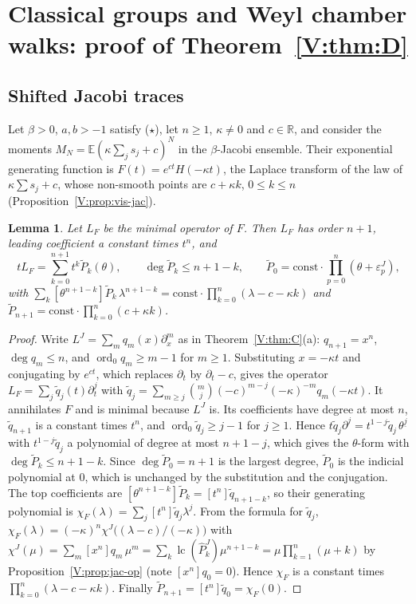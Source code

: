 \documentclass[11pt,a4paper]{article}
\newtheorem{lemma}[theorem]{Lemma}
\theoremstyle{definition}
\theoremstyle{remark}
\newcommand{\R}{\mathbb R}
\newcommand{\E}{\mathbb E}
\newcommand{\ff}[2]{#1^{\underline{#2}}}
\DeclareMathOperator{\ord}{ord}
\DeclareMathOperator{\lc}{lc}
\numberwithin{equation}{section}
\begin{document}
\section{Classical groups and Weyl chamber walks: proof of Theorem~\ref{V:thm:D}}\label{V:sec:walks}

\subsection{Shifted Jacobi traces}
Let $\beta>0$, $a,b>-1$ satisfy \textup{($\star$)}, let $n\ge1$, $\kappa\ne0$ and $c\in\R$, and consider the moments $M_N=\E(\kappa\sum_js_j+c)^N$ in the $\beta$-Jacobi ensemble. Their exponential generating function is $F(t)=e^{ct}H(-\kappa t)$, the Laplace transform of the law of $\kappa\sum s_j+c$, whose non-smooth points are $c+\kappa k$, $0\le k\le n$ (Proposition~\ref{V:prop:vis-jac}).

\begin{lemma}\label{V:lem:shifted}
Let $L_F$ be the minimal operator of $F$. Then $L_F$ has order $n+1$, leading coefficient a constant times $t^n$, and
\[
tL_F=\sum_{k=0}^{n+1}t^k\tilde P_k(\theta),\qquad\deg\tilde P_k\le n+1-k,\qquad\tilde P_0=\mathrm{const}\cdot\prod_{p=0}^n(\theta+\varepsilon^J_p),
\]
with $\sum_k[\theta^{n+1-k}]\tilde P_k\,\lambda^{n+1-k}=\mathrm{const}\cdot\prod_{k=0}^{n}(\lambda-c-\kappa k)$ and $\tilde P_{n+1}=\mathrm{const}\cdot\prod_{k=0}^n(c+\kappa k)$.
\end{lemma}

\begin{proof}
Write $L^J=\sum_mq_m(x)\partial_x^m$ as in Theorem~\ref{V:thm:C}(a): $q_{n+1}=x^n$, $\deg q_m\le n$, and $\ord_0q_m\ge m-1$ for $m\ge1$. Substituting $x=-\kappa t$ and conjugating by $e^{ct}$, which replaces $\partial_t$ by $\partial_t-c$, gives the operator $L_F=\sum_j\tilde q_j(t)\partial_t^j$ with $\tilde q_j=\sum_{m\ge j}\binom mj(-c)^{m-j}(-\kappa)^{-m}q_m(-\kappa t)$. It annihilates $F$ and is minimal because $L^J$ is. Its coefficients have degree at most $n$, $\tilde q_{n+1}$ is a constant times $t^n$, and $\ord_0\tilde q_j\ge j-1$ for $j\ge1$. Hence $t\tilde q_j\partial^j=t^{1-j}\tilde q_j\,\ff\theta j$ with $t^{1-j}\tilde q_j$ a polynomial of degree at most $n+1-j$, which gives the $\theta$-form with $\deg\tilde P_k\le n+1-k$. Since $\deg\tilde P_0=n+1$ is the largest degree, $\tilde P_0$ is the indicial polynomial at $0$, which is unchanged by the substitution and the conjugation. The top coefficients are $[\theta^{n+1-k}]\tilde P_k=[t^n]\tilde q_{n+1-k}$, so their generating polynomial is $\chi_F(\lambda)=\sum_j[t^n]\tilde q_j\lambda^j$. From the formula for $\tilde q_j$, $\chi_F(\lambda)=(-\kappa)^n\chi^J\bigl((\lambda-c)/(-\kappa)\bigr)$ with $\chi^J(\mu)=\sum_m[x^n]q_m\,\mu^m=\sum_k\lc(\hat P^J_k)\mu^{n+1-k}=\mu\prod_{k=1}^n(\mu+k)$ by Proposition~\ref{V:prop:jac-op} (note $[x^n]q_0=0$). Hence $\chi_F$ is a constant times $\prod_{k=0}^n(\lambda-c-\kappa k)$. Finally $\tilde P_{n+1}=[t^n]\tilde q_0=\chi_F(0)$.
\end{proof}
\end{document}

